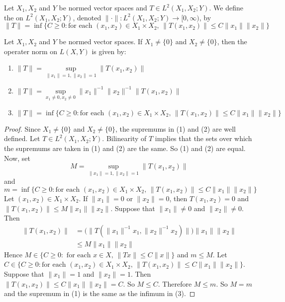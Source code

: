 \documentclass{book}
\begin{document}
	\begin{defn} 
	Let $X_1, X_2$ and $Y$ be normed vector spaces and $T \in L^2(X_1, X_2;Y)$. We define the  on $L^2(X_1, X_2;Y)$, denoted $\|\cdot\|: L^2(X_1, X_2; Y) \rightarrow [0, \infty)$, by  $$\|T\| =  \inf \{C \geq 0: \text{for each } (x_1, x_2) \in X_1 \times X_2\text{, } \|T(x_1, x_2) \|\leq C\|x_1\|\|x_2\|\}$$
	\end{defn}
	
	\begin{ex} 
		Let $X_1, X_2$ and $Y$ be normed vector spaces. If $X_1 \neq \{0\}$ and $ X_2 \neq \{0\}$, then the operater norm on $L(X,Y)$ is given by: 
		\begin{enumerate}
			\item $\|T\| = \sup\limits_{\|x_1\|=1 ,\|x_2\| = 1 }\|T(x_1, x_2)\|$
			\item $\|T\| = \sup\limits_{x_1 \neq 0, x_2 \neq 0 } \|x_1\|^{-1} \|x_2\|^{-1}\|T(x_1, x_2)\|$
			\item $\|T\| = \inf \{C \geq 0: \text{for each } (x_1, x_2) \in X_1 \times X_2\text{, } \|T(x_1, x_2) \|\leq C\|x_1\|\|x_2\|\}$
		\end{enumerate}
	\end{ex}
	
	\begin{proof} Since $X_1 \neq \{0\}$ and $ X_2 \neq \{0\}$, the supremums in (1) and (2) are well defined. Let $T \in L^2(X_1, X_2; Y)$. Bilinearity of $T$ implies that the sets over which the supremums are taken in (1) and (2) are the same. So (1) and (2) are equal.\\
		Now, set 
		$$M = \sup\limits_{\|x_1\|=1 ,\|x_2\| = 1 }\|T(x_1, x_2)\|$$ 
		and 
		$$m = \inf \{C \geq 0: \text{for each } (x_1, x_2) \in X_1 \times X_2\text{, } \|T(x_1, x_2) \|\leq C\|x_1\|\|x_2\|\}$$ 
		Let $(x_1,x_2) \in X_1 \times X_2$. If $\|x_1 \|=0$ or $\|x_2 \|=0$, then $T(x_1, x_2) = 0$ and $\|T(x_1, x_2) \|\leq M \|x_1 \| \|x_2\|$. Suppose that $\|x_1 \| \neq 0$ and $ \|x_2\|\neq 0$. Then 
		\begin{align*}
			\|T(x_1, x_2)\|
			&= \bigg(\big\|T(\|x_1\|^{-1} x_1, \|x_2\|^{-1} x_2 )\big\|\bigg)\|x_1 \| \|x_2\|\\
			& \leq M \|x_1\| \|x_2\|
		\end{align*}
		Hence $M \in \{C \geq 0: \text{ for each }x \in X\text{, } \|Tx \|\leq C \|x \|\}$ and $m \leq M$.
		Let $C \in \{C \geq 0: \text{for each } (x_1, x_2) \in X_1 \times X_2\text{, } \|T(x_1, x_2) \|\leq C\|x_1\|\|x_2\|\}$. Suppose that $\|x_1 \|=1$ and $\|x_2\| = 1$. Then $\| T (x_1, x_2) \| \leq C \|x_1 \| \|x_2 \|= C$. So $M \leq C$. Therefore $M \leq m$. So $M=m$ and the supremum in (1) is the same as the infimum in (3). 
	\end{proof}
\end{document}
